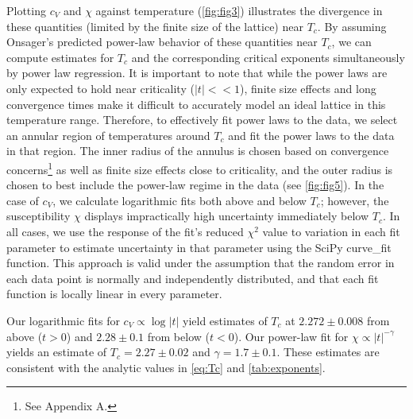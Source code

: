 \documentclass[letter,scriptaddress,twocolumn, prl,nofootinbib]{revtex4}
\begin{document}
Plotting $c_V$ and $\chi$ against temperature (\autoref{fig:fig3}) illustrates the divergence in these quantities (limited by the finite size of the lattice) near $T_c$. By assuming Onsager's predicted power-law behavior of these quantities near $T_c$, we can compute estimates for $T_c$ and the corresponding critical exponents simultaneously by power law regression. It is important to note that while the power laws are only expected to hold near criticality ($|t| << 1$), finite size effects and long convergence times make it difficult to accurately model an ideal lattice in this temperature range. Therefore, to effectively fit power laws to the data, we select an annular region of temperatures around $T_c$ and fit the power laws to the data in that region. The inner radius of the annulus is chosen based on convergence concerns\footnote{See Appendix A.} as well as finite size effects close to criticality, and the outer radius is chosen to best include the power-law regime in the data (see \autoref{fig:fig5}). In the case of $c_V$, we calculate logarithmic fits both above and below $T_c$; however, the susceptibility $\chi$ displays impractically high uncertainty immediately below $T_c$. In all cases, we use the response of the fit's reduced $\chi^2$ value to variation in each fit parameter to estimate uncertainty in that parameter using the SciPy curve\_fit function. This approach is valid under the assumption that the random error in each data point is normally and independently distributed, and that each fit function is locally linear in every parameter.

Our logarithmic fits for $c_V \propto \log |t|$ yield estimates of $T_c$ at $2.272 \pm 0.008$ from above ($t > 0$) and $2.28 \pm 0.1$ from below ($t < 0$). Our power-law fit for $\chi \propto |t|^{-\gamma}$ yields an estimate of $T_c = 2.27 \pm 0.02$ and $\gamma = 1.7 \pm 0.1$. These estimates are consistent with the analytic values in \autoref{eq:Tc} and \autoref{tab:exponents}.
\end{document}
